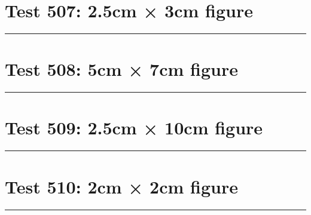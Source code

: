 \documentclass[a4paper,11pt]{article}
\begin{document}
\section*{Test 507: 2.5cm × 3cm figure}
\begin{swarmwrap}%
  \begin{minipage}[t]{2cm}
    \centering
    \rule{\linewidth}{3cm}
  \end{minipage}%
\end{swarmwrap}%
\swarmwrapnext
\lipsum[97]
\lipsum[98]
\lipsum[99]
\lipsum[100]
\lipsum[101]
\lipsum[102]
\section*{Test 508: 5cm × 7cm figure}
\begin{swarmwrap}%
  \begin{minipage}[t]{5cm}
    \centering
    \rule{\linewidth}{7cm}
  \end{minipage}%
\end{swarmwrap}%
\swarmwrapnext
\lipsum[38]
\lipsum[39]
\lipsum[40]
\lipsum[41]
\lipsum[42]
\section*{Test 509: 2.5cm × 10cm figure}
\begin{swarmwrap}%
  \begin{minipage}[t]{2cm}
    \centering
    \rule{\linewidth}{10cm}
  \end{minipage}%
\end{swarmwrap}%
\swarmwrapnext
\lipsum[130]
\lipsum[131]
\lipsum[132]
\lipsum[133]
\lipsum[134]
\lipsum[135]
\section*{Test 510: 2cm × 2cm figure}
\begin{swarmwrap}%
  \begin{minipage}[t]{2cm}
    \centering
    \rule{\linewidth}{2cm}
  \end{minipage}%
\end{swarmwrap}%
\swarmwrapnext
\lipsum[37]
\lipsum[38]
\lipsum[39]
\end{document}
